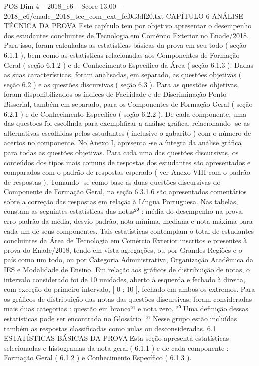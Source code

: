 \begin{textsample}{POS Dim 4 – 2018\_c6 – Score 13.00 – 2018\_c6/enade\_2018\_tec\_com\_ext\_fef0d3df20.txt}  \label{ex:f4_pos_009}
CAPÍTULO 6 ANÁLISE TÉCNICA DA PROVA Este capítulo tem por objetivo apresentar o desempenho dos estudantes concluintes de Tecnologia em Comércio Exterior no Enade/2018.
Para isso, foram calculadas as estatísticas básicas da prova em seu todo ( seção 6.1.1 ), bem como as estatísticas relacionadas aos Componentes de Formação Geral ( seção 6.1.2 ) e de Conhecimento Específico da Área ( seção 6.1.3 ).
Dadas as suas características, foram analisadas, em separado, as questões objetivas ( seção 6.2 ) e as questões discursivas ( seção 6.3 ).
Para as questões objetivas, foram disponibilizados os índices de Facilidade e de Discriminação Ponto-Bisserial, também em separado, para os Componentes de Formação Geral ( seção 6.2.1 ) e de Conhecimento Específico ( seção 6.2.2 ).
De cada componente, uma das questões foi escolhida para exemplificar a análise gráfica, relacionando -se as alternativas escolhidas pelos estudantes ( inclusive o gabarito ) com o número de acertos no componente.
No Anexo I, apresenta -se a íntegra da análise gráfica para todas as questões objetivas.
Para cada uma das questões discursivas, os conteúdos dos tipos mais comuns de respostas dos estudantes são apresentados e comparados com o padrão de respostas esperado ( ver Anexo VIII com o padrão de respostas ).
Tomando -se como base as duas questões discursivas do Componente de Formação Geral, na seção 6.3.1.6 são apresentados comentários sobre a correção das respostas em relação à Língua Portuguesa.
Nas tabelas, constam as seguintes estatísticas das notas²⁰ : média do desempenho na prova, erro padrão da média, desvio padrão, nota mínima, mediana e nota máxima para cada um de seus componentes.
Tais estatísticas contemplam o total de estudantes concluintes da Área de Tecnologia em Comércio Exterior inscritos e presentes à prova do Enade/2018, tendo em vista agregações, ou por Grandes Regiões e o país como um todo, ou por Categoria Administrativa, Organização Acadêmica da IES e Modalidade de Ensino.
Em relação aos gráficos de distribuição de notas, o intervalo considerado foi de 10 unidades, aberto à esquerda e fechado à direita, com exceção do primeiro intervalo, [ 0 ; 10 ], fechado em ambos os extremos.
Para os gráficos de distribuição das notas das questões discursivas, foram consideradas mais duas categorias : questão em branco²¹ e nota zero. ²⁰ Uma definição dessas estatísticas pode ser encontrada no Glossário. ²¹ Nesse grupo estão incluídas também as respostas classificadas como nulas ou desconsideradas. 6.1 ESTATÍSTICAS BÁSICAS DA PROVA Esta seção apresenta estatísticas selecionadas e histogramas da nota geral ( 6.1.1 ) e de cada componente : Formação Geral ( 6.1.2 ) e Conhecimento Específico ( 6.1.3 ).

\end{textsample}
